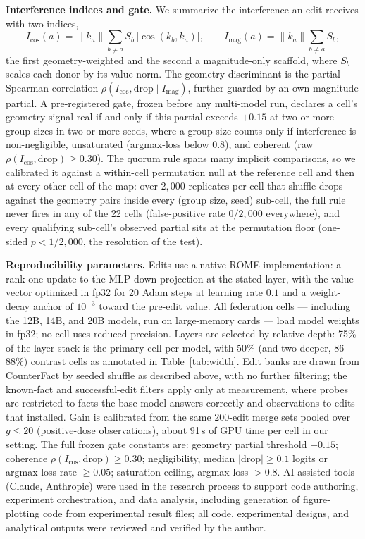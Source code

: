 \documentclass[preprint,12pt]{elsarticle}
\begin{document}
\textbf{Interference indices and gate.} We summarize the interference an edit receives with
two indices,
\begin{equation}
I_{\cos}(a)=\lVert k_a\rVert\sum_{b\neq a} S_b\,\bigl|\cos(k_b,k_a)\bigr|,
\qquad
I_{\mathrm{mag}}(a)=\lVert k_a\rVert\sum_{b\neq a} S_b,
\label{eq:indices}
\end{equation}
the first geometry-weighted and the second a magnitude-only scaffold, where $S_b$ scales
each donor by its value norm. The geometry discriminant is the partial Spearman correlation
$\rho(I_{\cos},\mathrm{drop}\mid I_{\mathrm{mag}})$, further guarded by an own-magnitude
partial. A pre-registered gate, frozen before any multi-model run, declares a cell's
geometry signal real if and only if this partial exceeds $+0.15$ at two or more group
sizes in two or more seeds, where a group size counts only if interference is
non-negligible, unsaturated (argmax-loss below $0.8$), and coherent (raw
$\rho(I_{\cos},\mathrm{drop})\geq 0.30$). The quorum rule spans many implicit
comparisons, so we calibrated it against a within-cell permutation null at the
reference cell and then at every other cell of the map: over $2{,}000$ replicates
per cell that shuffle drops against the geometry pairs inside every (group size,
seed) sub-cell, the full rule never fires in any of the 22 cells (false-positive
rate $0/2{,}000$ everywhere), and every qualifying sub-cell's observed partial sits
at the permutation floor (one-sided $p<1/2{,}000$, the resolution of the test).

\textbf{Reproducibility parameters.} Edits use a native ROME implementation: a
rank-one update to the MLP down-projection at the stated layer, with the value vector
optimized in fp32 for 20 Adam steps at learning rate $0.1$ and a weight-decay anchor
of $10^{-3}$ toward the pre-edit value. All federation cells --- including the 12B,
14B, and 20B models, run on large-memory cards --- load model weights in fp32; no
cell uses reduced precision. Layers are selected by relative
depth: 75\% of the layer stack is the primary cell per model, with 50\% (and two
deeper, 86--88\%) contrast cells as annotated in Table~\ref{tab:width}. Edit banks are drawn from
CounterFact by seeded shuffle as described above, with no further filtering; the
known-fact and successful-edit filters apply only at measurement, where probes are
restricted to facts the base model answers correctly and observations to edits that
installed. Gain is calibrated from the same $200$-edit merge sets pooled over
$g\leq20$ (positive-dose observations), about 91\,s of GPU time per cell in our
setting. The full frozen gate constants are: geometry partial threshold $+0.15$;
coherence $\rho(I_{\cos},\mathrm{drop})\geq0.30$; negligibility, median
$|\mathrm{drop}|\geq0.1$ logits or argmax-loss rate $\geq0.05$; saturation ceiling,
argmax-loss $>0.8$. AI-assisted tools (Claude, Anthropic) were used in the research
process to support code authoring, experiment orchestration, and data analysis,
including generation of figure-plotting code from experimental result files; all code,
experimental designs, and analytical outputs were reviewed and verified by the author.
\end{document}
